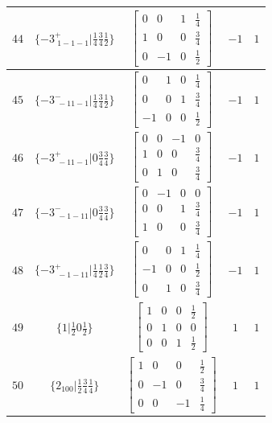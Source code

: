 \documentclass[fleqn,8pt]{jsarticle}
\begin{document}
\begin{longtable}{ccccc}
$ 44 $ & $ \{-3^{+}_{\,\,1-1-1}|\frac{1}{4} \frac{3}{4} \frac{1}{2}\} $ & $ \begin{bmatrix} 0 & 0 & 1 & \frac{1}{4} \\ 1 & 0 & 0 & \frac{3}{4} \\ 0 & -1 & 0 & \frac{1}{2} \end{bmatrix} $ & $ -1 $ & $ 1 $ \\ \hline
$ 45 $ & $ \{-3^{-}_{\,\,-11-1}|\frac{1}{4} \frac{3}{4} \frac{1}{2}\} $ & $ \begin{bmatrix} 0 & 1 & 0 & \frac{1}{4} \\ 0 & 0 & 1 & \frac{3}{4} \\ -1 & 0 & 0 & \frac{1}{2} \end{bmatrix} $ & $ -1 $ & $ 1 $ \\ \hline
$ 46 $ & $ \{-3^{+}_{\,\,-11-1}|0 \frac{3}{4} \frac{3}{4}\} $ & $ \begin{bmatrix} 0 & 0 & -1 & 0 \\ 1 & 0 & 0 & \frac{3}{4} \\ 0 & 1 & 0 & \frac{3}{4} \end{bmatrix} $ & $ -1 $ & $ 1 $ \\ \hline
$ 47 $ & $ \{-3^{-}_{\,\,-1-11}|0 \frac{3}{4} \frac{3}{4}\} $ & $ \begin{bmatrix} 0 & -1 & 0 & 0 \\ 0 & 0 & 1 & \frac{3}{4} \\ 1 & 0 & 0 & \frac{3}{4} \end{bmatrix} $ & $ -1 $ & $ 1 $ \\ \hline
$ 48 $ & $ \{-3^{+}_{\,\,-1-11}|\frac{1}{4} \frac{1}{2} \frac{3}{4}\} $ & $ \begin{bmatrix} 0 & 0 & 1 & \frac{1}{4} \\ -1 & 0 & 0 & \frac{1}{2} \\ 0 & 1 & 0 & \frac{3}{4} \end{bmatrix} $ & $ -1 $ & $ 1 $ \\ \hline
$ 49 $ & $ \{1|\frac{1}{2} 0 \frac{1}{2}\} $ & $ \begin{bmatrix} 1 & 0 & 0 & \frac{1}{2} \\ 0 & 1 & 0 & 0 \\ 0 & 0 & 1 & \frac{1}{2} \end{bmatrix} $ & $ 1 $ & $ 1 $ \\ \hline
$ 50 $ & $ \{2{}_{100}|\frac{1}{2} \frac{3}{4} \frac{1}{4}\} $ & $ \begin{bmatrix} 1 & 0 & 0 & \frac{1}{2} \\ 0 & -1 & 0 & \frac{3}{4} \\ 0 & 0 & -1 & \frac{1}{4} \end{bmatrix} $ & $ 1 $ & $ 1 $ \\ \hline

\end{longtable}
\end{document}
